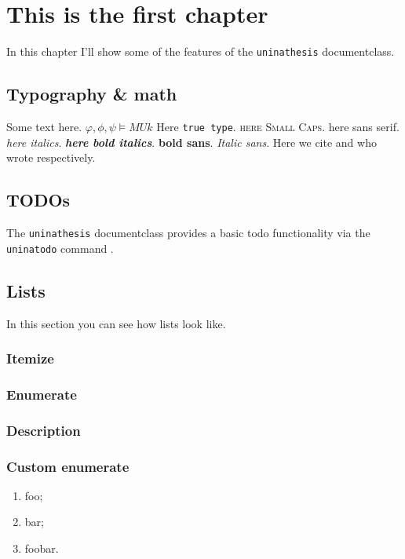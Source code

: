 \chapter{This is the first chapter}\label{chap:first}

\inlineminitoc

\noindent In this chapter I'll show some of the features of the \texttt{uninathesis} documentclass.

\section{Typography \& math}
Some text here. \(\varphi,\phi,\psi\vDash M U k\)
Here \texttt{true type}. 
\textsc{here Small Caps}. 
\textsf{here sans serif}. 
\emph{here italics}.
\textbf{\emph{here bold italics}}.
\textbf{\textsf{bold sans}}.
\textsf{\emph{Italic sans}}.
Here we cite \citeauthor{dijkstra1972humbleprogrammer} and \citeauthor{lamport1982proving}
who wrote \cite{dijkstra1972humbleprogrammer,lamport1982proving} respectively.
\blindmathpaper

\section{TODOs}
The \texttt{uninathesis} documentclass provides a basic todo functionality via 
the \texttt{uninatodo} command . 

\section{Lists}
In this section you can see how lists look like.
\subsection{Itemize}
\blinditemize
\subsection{Enumerate}
\blindenumerate
\subsection{Description}
\blinddescription
\subsection{Custom enumerate}
\begin{enumerate}[label=(\roman*)]
    \item foo;
    \item bar;
    \item foobar.
\end{enumerate}
